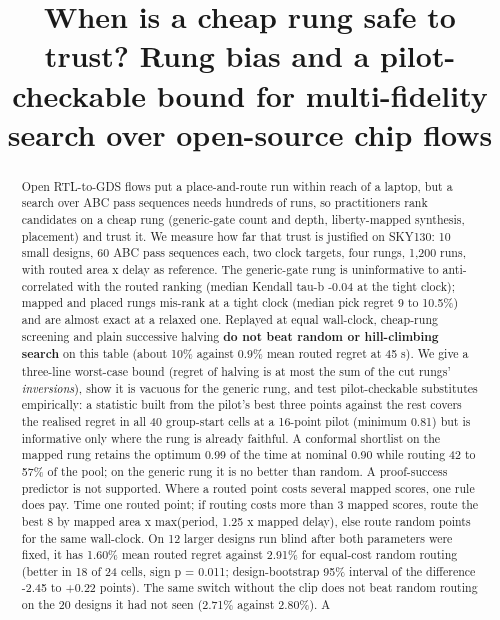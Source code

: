 \documentclass[conference]{IEEEtran}
\begin{document}
\title{When is a cheap rung safe to trust? Rung bias and a pilot-checkable bound for multi-fidelity search over open-source chip flows}
\author{}
\maketitle
\begin{abstract}
Open RTL-to-GDS flows put a place-and-route run within reach of a
laptop, but a search over ABC pass sequences needs hundreds of runs, so
practitioners rank candidates on a cheap rung (generic-gate count and
depth, liberty-mapped synthesis, placement) and trust it. We measure how
far that trust is justified on SKY130: 10 small designs, 60 ABC pass
sequences each, two clock targets, four rungs, 1,200 runs, with routed
area x delay as reference. The generic-gate rung is uninformative to
anti-correlated with the routed ranking (median Kendall tau-b -0.04 at
the tight clock); mapped and placed rungs mis-rank at a tight clock
(median pick regret 9 to 10.5\%) and are almost exact at a relaxed one.
Replayed at equal wall-clock, cheap-rung screening and plain successive
halving \textbf{do not beat random or hill-climbing search} on this
table (about 10\% against 0.9\% mean routed regret at 45 s). We give a
three-line worst-case bound (regret of halving is at most the sum of the
cut rungs' \emph{inversions}), show it is vacuous for the generic rung,
and test pilot-checkable substitutes empirically: a statistic built from
the pilot's best three points against the rest covers the realised
regret in all 40 group-start cells at a 16-point pilot (minimum 0.81)
but is informative only where the rung is already faithful. A conformal
shortlist on the mapped rung retains the optimum 0.99 of the time at
nominal 0.90 while routing 42 to 57\% of the pool; on the generic rung
it is no better than random. A proof-success predictor is not supported.
Where a routed point costs several mapped scores, one rule does pay.
Time one routed point; if routing costs more than 3 mapped scores, route
the best 8 by mapped area x max(period, 1.25 x mapped delay), else route
random points for the same wall-clock. On 12 larger designs run blind
after both parameters were fixed, it has 1.60\% mean routed regret
against 2.91\% for equal-cost random routing (better in 18 of 24 cells,
sign p = 0.011; design-bootstrap 95\% interval of the difference -2.45
to +0.22 points). The same switch without the clip does not beat random
routing on the 20 designs it had not seen (2.71\% against 2.80\%). A

\end{abstract}
\end{document}
